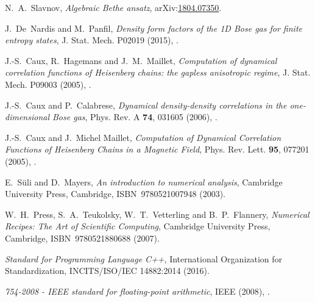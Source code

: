 \documentclass[11pt, a4paper]{report} %
\begin{document}
\begin{thebibliography}{99}
N.~A.~Slavnov, \textit{Algebraic Bethe ansatz}, arXiv:\href{https://arxiv.org/abs/1804.07350}{1804.07350}.



J.~De~Nardis and M.~Panfil, \textit{Density form factors of the 1D Bose gas for finite entropy states}, J. Stat. Mech. P02019 (2015), .




J.-S.~Caux, R.~Hagemans and J.~M.~Maillet, \textit{Computation of dynamical correlation functions of Heisenberg chains: the gapless anisotropic regime}, J. Stat. Mech. P09003 (2005), .




J.-S.~Caux and P.~Calabrese, \textit{Dynamical density-density correlations in the one-dimensional Bose gas}, Phys. Rev. A \textbf{74}, 031605 (2006), .



J.-S.~Caux and J.~Michel Maillet, \textit{Computation of Dynamical Correlation Functions of Heisenberg Chains in a Magnetic Field}, Phys. Rev. Lett. \textbf{95}, 077201 (2005), .





E.~S{\"u}li and D.~Mayers, \textit{An introduction to numerical analysis}, Cambridge University Press, Cambridge, ISBN~9780521007948 (2003).





W.~H.~Press, S.~A.~Teukolsky, W.~T.~Vetterling and B.~P.~Flannery, \textit{Numerical Recipes: The Art of Scientific Computing}, Cambridge University Press, Cambridge, ISBN~9780521880688 (2007).





\textit{Standard for Programming Language C++}, International Organization for Standardization, INCITS/ISO/IEC 14882:2014 (2016).






\emph{754-2008 - {IEEE} standard for floating-point arithmetic}, IEEE (2008), .





\end{thebibliography}
\end{document}
